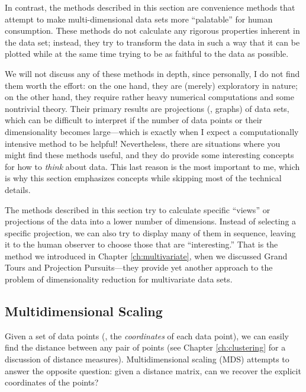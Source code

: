 In contrast, the methods described in this section are convenience
methods that attempt to make multi-dimensional data sets more
``palatable'' for human consumption. These methods do not calculate
any rigorous properties inherent in the data set; instead, they try to
transform the data in such a way that it can be plotted while at the
same time trying to be as faithful to the data as possible.

We will not discuss any of these methods in depth, since personally, I
do not find them worth the effort: on the one hand, they are (merely)
exploratory in nature; on the other hand, they require rather heavy
numerical computations and some nontrivial theory.  Their primary
results are projections (\ie, graphs) of data sets, which can be
difficult to interpret if the number of data points or their
dimensionality becomes large---which is exactly when I expect a
computationally intensive method to be helpful!  Nevertheless,\vadjust{\pagebreak} there
are situations where you might find these methods useful, and they do
provide some interesting concepts for how to \emph{think} about data.
This last reason is the most important to me, which is why this
section emphasizes concepts while skipping most of the technical
details.
 

The methods described in this section try to calculate specific
``views'' or projections of the data into a lower number of
dimensions.  Instead of selecting a specific projection, we can also
try to display many of them in sequence, leaving it to the human
observer to choose those that are ``interesting.'' That is the method
we introduced in Chapter \ref{ch:multivariate}, when we discussed
Grand Tours and Projection Pursuits---they provide yet another
approach to the problem of dimensionality reduction for multivariate
data sets.
 

\subsection{Multidimensional Scaling}


Given a set of data points (\ie, the \emph{coordinates} of each data
point), we can easily find the distance between any pair of points
(see Chapter \ref{ch:clustering} for a discussion of distance
measures). Multidimensional scaling (MDS) attempts to answer the
opposite question: given a distance matrix, can we recover the
explicit coordinates of the points?

